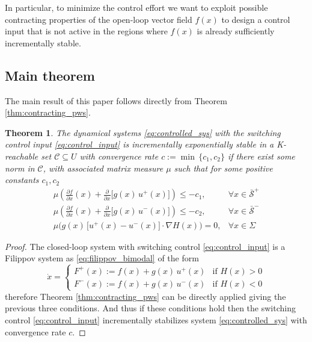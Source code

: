 \documentclass[letterpaper, 10 pt, conference]{ieeeconf}
\newtheorem{theorem}{Theorem}
\begin{document}
In particular, to minimize the control effort we want to exploit possible contracting properties of the open-loop vector field $f(x)$ to design a control input that is not active in the regions where $f(x)$ is already sufficiently incrementally stable.

\subsection{Main theorem}
The main result of this paper follows directly from Theorem \ref{thm:contracting_pws}.
\begin{theorem}
\label{thm:main_control}
The dynamical systems \eqref{eq:controlled_sys} with the switching control input \eqref{eq:control_input} is incrementally exponentially stable in a K-reachable set $\mathcal{C}\subseteq U$ with convergence rate $c:=\min\,\{c_1,c_2\}$ if there exist some norm in $\mathcal{C}$, with associated matrix measure $\mu$ such that for some positive constants $c_1, c_2$
\begin{eqnarray}
\label{eq:thm:control_condition1}
\mu\left(\frac{\partial f}{\partial x}(x)+\frac{\partial}{\partial x}\big[ g(x)\,u^+(x) \big] \right) \leq -c_1, &\forall x \in \bar{\mathcal{S}}^+\\
\label{eq:thm:control_condition2}
\mu\left( \frac{\partial f}{\partial x}(x)+\frac{\partial}{\partial x}\big[ g(x)\,u^-(x) \big]\right) \leq -c_2, &\forall x \in \bar{\mathcal{S}}^-\\ 
\label{eq:thm:control_condition3}
\mu\Big( g(x)\,\big[ u^+(x)-u^-(x)\big] \cdot \nabla H(x) \Big) = 0, &\forall x \in \Sigma
\end{eqnarray}
\end{theorem}
\vspace{0.3cm}
\begin{proof}
The closed-loop system with switching control \eqref{eq:control_input} is a Filippov system as \eqref{eq:filippov_bimodal} of the form
\begin{equation}
\label{eq:closed_loop_sys}
\dot{x}=
\begin{cases}
F^+(x):=f(x)+g(x)\,u^+(x) & \mbox{if } H(x)>0\\
F^-(x):=f(x)+g(x)\,u^-(x) & \mbox{if } H(x)<0
\end{cases}
\end{equation}
therefore Theorem \ref{thm:contracting_pws} can be directly applied giving the previous three conditions. And thus if these conditions hold then the switching control \eqref{eq:control_input} incrementally stabilizes system \eqref{eq:controlled_sys} with convergence rate $c$.
\end{proof}
\end{document}
